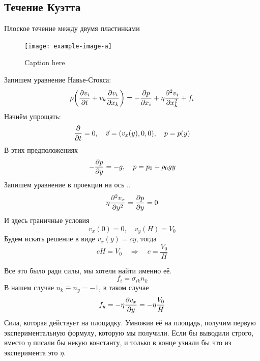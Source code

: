 \subsection{Течение Куэтта}
Плоское течение между двумя пластинками 
\begin{figure}[h!]
    \centering
    \texttt{[image: example-image-a]}
    \caption{Caption here}
    \label{fig:figure1}
\end{figure}

Запишем уравнение Навье-Стокса:
\begin{equation}
    \rho\qty(
        \pdv{v_i}{t}+v_k\pdv{v_i}{x_k}
    )=
    -\pdv{p}{x_i}+\eta\pdv[2]{v_i}{x_k}+f_i
\end{equation}
Начнём упрощать:
\begin{equation}
    \pdv{t} = 0,\quad
    \vec{v} = \qty(v_x (y),0,0), \quad
    p = p(y)
\end{equation}
В этих предположениях 
\begin{equation}
    -\pdv{p}{y} = -g, \quad
    p = p_0 + \rho_0 g y
\end{equation}
Запишем уравнение в проекции на ось ..
\begin{equation}
    \eta\pdv[2]{v_x}{y} = \pdv{p}{y} = 0
\end{equation}
И здесь граничные условия
\begin{equation}
    v_x (0) = 0, \quad
    v_y (H) = V_0
\end{equation}
Будем искать решение в виде $v_x (y) = cy$, тогда
\begin{equation}
    cH = V_0 \quad \Rightarrow \quad c= \frac{V_0}{H}
\end{equation}

Все это было ради силы, мы хотели найти именно её.
\begin{equation}
    f_i = \sigma_{ik} n_k 
\end{equation}
В нашем случае $n_k \equiv n_y = -1$, в таком случае
\begin{equation}
    f_y = -\eta \pdv{v_x}{y}= -\eta \frac{V_0}{H}
\end{equation}
Сила, которая действует на площадку. Умножив её на площадь, получим первую экспериментальную формулу, которую мы получили. Если
бы выводили строго, вместо $\eta$ писали бы некую константу, и
только в конце узнали бы что из эксперимента это $\eta$.

